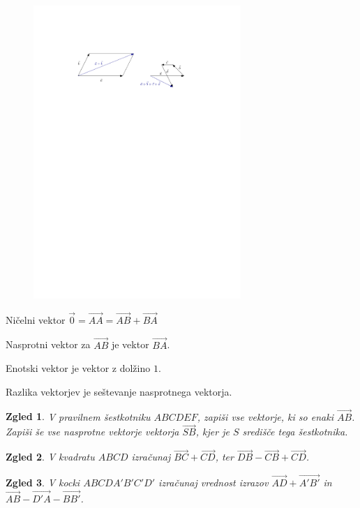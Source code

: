 \documentclass{article}
\newtheorem*{zgled}{Zgled}
\begin{document}
\begin{figure}[H]
    \includegraphics[width=0.7\textwidth]{sestevanje_vektorjev.pdf}
    \centering
\end{figure}

Ničelni vektor $\vec{0}=\vec{AA}=\vec{AB}+\vec{BA}$

Nasprotni vektor za $\vec{AB}$ je vektor $\vec{BA}$.

Enotski vektor je vektor z dolžino $1$.

Razlika vektorjev  je seštevanje nasprotnega vektorja.

\begin{zgled}
    V pravilnem šestkotniku $ABCDEF$, zapiši vse vektorje, ki so enaki $\vec{AB}$. Zapiši še vse nasprotne vektorje vektorja $\vec{SB}$, kjer je $S$ središče tega šestkotnika.
\end{zgled}

\begin{zgled}
    V kvadratu $ABCD$ izračunaj $\vec{BC}+\vec{CD}$, ter $\vec{DB}-\vec{CB}+\vec{CD}$.
\end{zgled}

\begin{zgled}
    V kocki $ABCDA'B'C'D'$ izračunaj vrednost izrazov $\vec{AD}+\vec{A'B'}$ in $\vec{AB}-\vec{D'A}-\vec{BB'}$.
\end{zgled}
\end{document}
